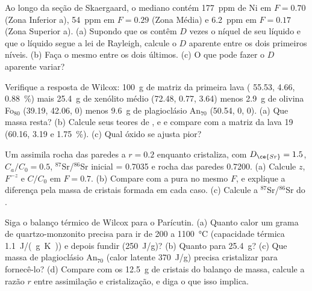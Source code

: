 \begin{exercise}[$\star\star$]\label{exo:b2:magmatic-differentiation:8}
Ao longo da seção de Skaergaard, o  mediano contém \qty{177}{ppm} de Ni em
$F = 0.70$ (Zona Inferior a), \qty{54}{ppm} em $F = 0.29$ (Zona Média) e
\qty{6.2}{ppm} em $F = 0.17$ (Zona Superior a). (a) Supondo que os  contêm
$D$ vezes o níquel de seu líquido e que o líquido segue a lei de Rayleigh,
calcule o $D$ aparente entre os dois primeiros níveis. (b) Faça o mesmo entre os
dois últimos. (c) O que pode fazer o $D$ aparente variar?
\end{exercise}

\begin{exercise}[$\star\star$]\label{exo:b2:magmatic-differentiation:9}
Verifique a resposta de Wilcox: \qty{100}{g} de matriz da primeira lava (
55.53,  4.66,  \qty{0.88}{\percent}) mais \qty{25.4}{g} de xenólito
médio (72.48, 0.77, 3.64) menos \qty{2.9}{g} de olivina Fo$_{80}$ (39.19, 42.06, 0)
menos \qty{9.6}{g} de plagioclásio An$_{70}$ (50.54, 0, 0). (a) Que massa resta?
(b) Calcule seus teores de ,  e  e compare com a matriz da
lava 19 (60.16, 3.19 e \qty{1.75}{\percent}). (c) Qual óxido se ajusta pior?
\end{exercise}

\begin{exercise}[$\star\star\star$]\label{exo:b2:magmatic-differentiation:10}
Um  assimila rocha das paredes a $r = 0.2$ enquanto cristaliza, com $D_{\ce{Sr}} =
1.5$, $C_a/C_0 = 0.5$, $^{87}$Sr/$^{86}$Sr inicial = 0.7035 e rocha das paredes 0.7200.
(a) Calcule $z$, $F^{-z}$ e $C/C_0$ em $F = 0.7$. (b) Compare com a 
pura no mesmo $F$, e explique a diferença pela massa de cristais
formada em cada caso. (c) Calcule a $^{87}$Sr/$^{86}$Sr do .
\end{exercise}

\begin{exercise}[$\star\star\star$]\label{exo:b2:magmatic-differentiation:11}
Siga o balanço térmico de Wilcox para o Parícutin. (a) Quanto calor um grama de quartzo-monzonito
precisa para ir de 200 a \qty{1100}{\celsius} (capacidade térmica
\qty{1.1}{J/(g.K)}) e depois fundir (\qty{250}{J/g})? (b) Quanto para
\qty{25.4}{g}? (c) Que massa de plagioclásio An$_{70}$ (calor latente \qty{370}{J/g})
precisa cristalizar para fornecê-lo? (d) Compare com os \qty{12.5}{g} de cristais do
balanço de massa, calcule a razão $r$ entre assimilação e cristalização, e diga o que
isso implica.
\end{exercise}

